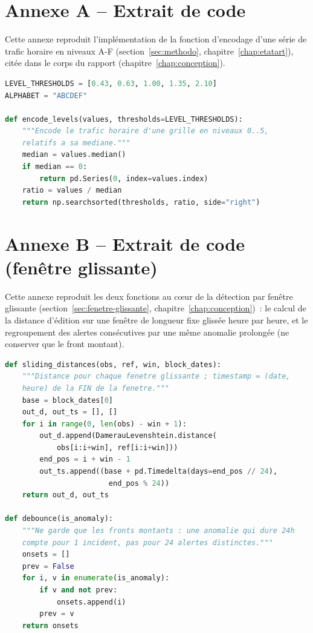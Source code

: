 \chapter*{Annexe A -- Extrait de code}
\label{annexe:code}

Cette annexe reproduit l'implémentation de la fonction d'encodage
d'une série de trafic horaire en niveaux A-F (section~\ref{sec:methodo},
chapitre~\ref{chap:etatart}), citée dans le corps du rapport
(chapitre~\ref{chap:conception}).

\begin{lstlisting}[language=Python, basicstyle=\small\ttfamily, frame=single, caption={Encodage vectorisé d'une série horaire en niveaux A-F}, label={lst:encode}]
LEVEL_THRESHOLDS = [0.43, 0.63, 1.00, 1.35, 2.10]
ALPHABET = "ABCDEF"

def encode_levels(values, thresholds=LEVEL_THRESHOLDS):
    """Encode le trafic horaire d'une grille en niveaux 0..5,
    relatifs a sa mediane."""
    median = values.median()
    if median == 0:
        return pd.Series(0, index=values.index)
    ratio = values / median
    return np.searchsorted(thresholds, ratio, side="right")
\end{lstlisting}

\clearpage
\chapter*{Annexe B -- Extrait de code (fenêtre glissante)}
\label{annexe:code-fenetre}

Cette annexe reproduit les deux fonctions au cœur de la détection par
fenêtre glissante (section~\ref{sec:fenetre-glissante},
chapitre~\ref{chap:conception})~: le calcul de la distance
d'édition sur une fenêtre de longueur fixe glissée heure par heure, et
le regroupement des alertes consécutives par une même anomalie
prolongée (ne conserver que le \og{}front montant\fg{}).

\begin{lstlisting}[language=Python, basicstyle=\small\ttfamily, frame=single, caption={Distance sur fenêtre glissante et regroupement des alertes}, label={lst:sliding}]
def sliding_distances(obs, ref, win, block_dates):
    """Distance pour chaque fenetre glissante ; timestamp = (date,
    heure) de la FIN de la fenetre."""
    base = block_dates[0]
    out_d, out_ts = [], []
    for i in range(0, len(obs) - win + 1):
        out_d.append(DamerauLevenshtein.distance(
            obs[i:i+win], ref[i:i+win]))
        end_pos = i + win - 1
        out_ts.append((base + pd.Timedelta(days=end_pos // 24),
                        end_pos % 24))
    return out_d, out_ts

def debounce(is_anomaly):
    """Ne garde que les fronts montants : une anomalie qui dure 24h
    compte pour 1 incident, pas pour 24 alertes distinctes."""
    onsets = []
    prev = False
    for i, v in enumerate(is_anomaly):
        if v and not prev:
            onsets.append(i)
        prev = v
    return onsets
\end{lstlisting}

